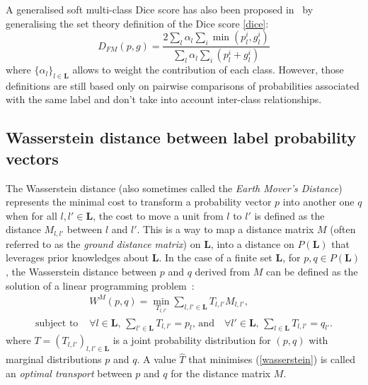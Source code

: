 \documentclass[runningheads,orivec,a4paper]{llncs}
\begin{document}
A generalised soft multi-class Dice score has also been
proposed in~\cite{gdsc,Sudre2017} by generalising the set theory definition of
the Dice score \eqref{dice}: 
\begin{equation}\label{gdsc}
D_{FM}(p,g) = \frac{2\sum_{l}\alpha_{l}\sum_{i}\min(p^i_l,g^i_l)}{\sum_{l}\alpha_{l}\sum_{i}(p^i_l + g^i_l)}
\end{equation}
where $\{\alpha_l\}_{l \in \mathbf{L}}$ allows to weight the
contribution of each class. However, those definitions are still based
only on pairwise comparisons of probabilities associated with the same
label and don't take into account inter-class relationships.

\subsection{Wasserstein distance between label probability vectors}
The Wasserstein distance (also sometimes called the \emph{Earth
	Mover's Distance}) represents the minimal cost to transform a
probability vector $p$ into another one $q$ when for all $l,l' \in
\mathbf{L}$, the cost to move a unit from $l$ to $l'$ is defined as
the distance $M_{l,l'}$ between $l$ and $l'$. 
%
This is a way to map a distance matrix $M$
(often referred to as the \emph{ground distance matrix})
on
$\mathbf{L}$, into a distance on $P({\mathbf{L}})$ that leverages
prior knowledges about $\mathbf{L}$. 
%
In the case of a finite set $\mathbf{L}$, for $p, q \in
P({\mathbf{L}})$, the Wasserstein distance between $p$ and $q$ derived
from $M$ can be defined as the solution of a linear programming
problem~\cite{fast_emd}:
\begin{equation}\label{wasserstein}
\begin{split}
&W^M(p,q) = \min_{T_{l,l'}} \sum_{l,l' \in \mathbf{L}}
T_{l,l'}M_{l,l'}, \\
\textrm{subject to }	&\forall l \in  \mathbf{L}, \, \sum_{l' \in
	\mathbf{L}}T_{l,l'} = p_l,\, \textrm{and} \quad
\forall l' \in  \mathbf{L}, \, \sum_{l \in \mathbf{L}}T_{l,l'} =
q_{l'}.
\end{split}
\end{equation}
where $T=(T_{l,l'})_{l,l' \in \mathbf{L}}$ is a joint probability distribution for $(p,q)$ with marginal distributions $p$ and $q$.
%
A value $\hat{T}$ that minimises (\ref{wasserstein}) is called an
\emph{optimal transport} between $p$ and $q$ for the distance
matrix $M$.
\end{document}

